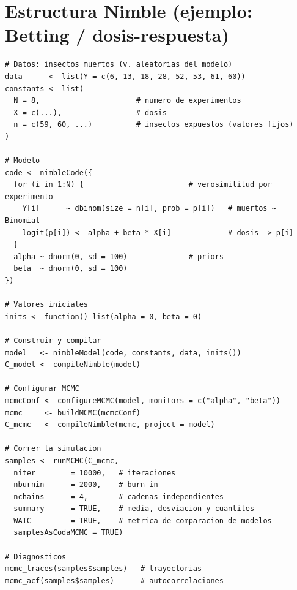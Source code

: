 \documentclass[11pt]{article}
\theoremstyle{definition}
\begin{document}
\section{Estructura Nimble (ejemplo: Betting / dosis-respuesta)}
\begin{verbatim}
# Datos: insectos muertos (v. aleatorias del modelo)
data      <- list(Y = c(6, 13, 18, 28, 52, 53, 61, 60))
constants <- list(
  N = 8,                      # numero de experimentos
  X = c(...),                 # dosis
  n = c(59, 60, ...)          # insectos expuestos (valores fijos)
)

# Modelo
code <- nimbleCode({
  for (i in 1:N) {                        # verosimilitud por experimento
    Y[i]      ~ dbinom(size = n[i], prob = p[i])   # muertos ~ Binomial
    logit(p[i]) <- alpha + beta * X[i]             # dosis -> p[i]
  }
  alpha ~ dnorm(0, sd = 100)              # priors
  beta  ~ dnorm(0, sd = 100)
})

# Valores iniciales
inits <- function() list(alpha = 0, beta = 0)

# Construir y compilar
model   <- nimbleModel(code, constants, data, inits())
C_model <- compileNimble(model)

# Configurar MCMC
mcmcConf <- configureMCMC(model, monitors = c("alpha", "beta"))
mcmc     <- buildMCMC(mcmcConf)
C_mcmc   <- compileNimble(mcmc, project = model)

# Correr la simulacion
samples <- runMCMC(C_mcmc,
  niter        = 10000,   # iteraciones
  nburnin      = 2000,    # burn-in
  nchains      = 4,       # cadenas independientes
  summary      = TRUE,    # media, desviacion y cuantiles
  WAIC         = TRUE,    # metrica de comparacion de modelos
  samplesAsCodaMCMC = TRUE)

# Diagnosticos
mcmc_traces(samples$samples)   # trayectorias
mcmc_acf(samples$samples)      # autocorrelaciones
\end{verbatim}
\end{document}
